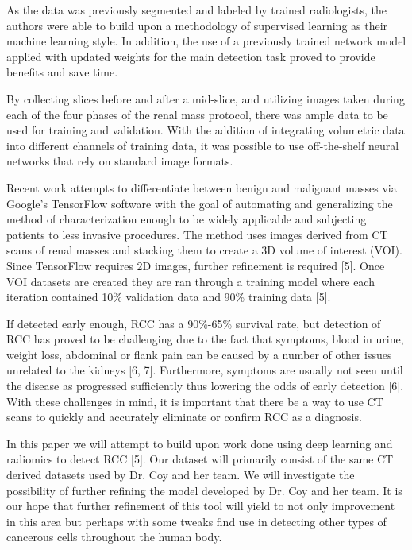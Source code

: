 \documentclass[10pt,journal,compsoc]{IEEEtran}
\begin{document}
As the data was previously segmented and labeled by trained radiologists, the authors were able to build upon a methodology of supervised learning as their machine learning style. In addition, the use of a previously trained network model applied with updated weights for the main detection task proved to provide benefits and save time.


By collecting slices before and after a mid-slice, and utilizing images taken during each of the four phases of the renal mass protocol, there was ample data to be used for training and validation. With the addition of integrating volumetric data into different channels of training data, it was possible to use off-the-shelf neural networks that rely on standard image formats. 


Recent work attempts to differentiate between benign and malignant masses via Google’s TensorFlow software with the goal of automating and generalizing the method of characterization enough to be widely applicable and subjecting patients to less invasive procedures.   The method uses images derived from CT scans of renal masses and stacking them to create a 3D volume of interest (VOI).  Since TensorFlow requires 2D images, further refinement is required [5]. Once VOI datasets are created they are ran through a training model where each iteration contained 10\% validation data and 90\% training data [5].  



If detected early enough, RCC has a 90\%-65\% survival rate, but detection of RCC has proved to be challenging due to the fact that symptoms, blood in urine, weight loss, abdominal or flank pain can be caused by a number of other issues unrelated to the kidneys [6, 7]. Furthermore, symptoms are usually not seen until the disease as progressed sufficiently thus lowering the odds of early detection [6].  With these challenges in mind, it is important that there be a way to use CT scans to quickly and accurately eliminate or confirm RCC as a diagnosis.  


In this paper we will attempt to build upon work done using deep learning and radiomics to detect RCC [5].  Our dataset will primarily consist of the same CT derived datasets used by Dr. Coy and her team.  We will investigate the possibility of further refining the model developed by Dr. Coy and her team. It is our hope that further refinement of this tool will yield to not only improvement in this area but perhaps with some tweaks find use in detecting other types of cancerous cells throughout the human body.  


\cleardoublepage

{}


\end{document}
